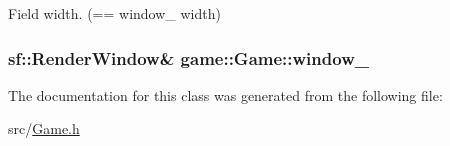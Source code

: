 \-Field width. (== window\-\_\- width) 

\hypertarget{classgame_1_1Game_a64323f95d196a67f2c2fea232d6013d9}{
\subsubsection[{window\-\_\-}]{\setlength{\rightskip}{0pt plus 5cm}sf\-::\-Render\-Window\& {\bf game\-::\-Game\-::window\-\_\-}}}\label{db/d26/classgame_1_1Game_a64323f95d196a67f2c2fea232d6013d9}


\-The documentation for this class was generated from the following file\-:\begin{DoxyCompactItemize}
\item 
src/\hyperlink{Game_8h}{\-Game.\-h}\end{DoxyCompactItemize}
